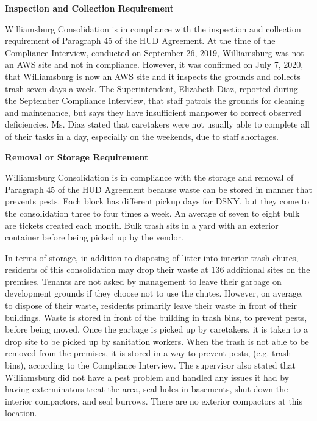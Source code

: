 

\textbf{Inspection and Collection Requirement}

Williamsburg Consolidation is in compliance with the inspection and collection requirement of Paragraph 45 of the HUD Agreement. At the time of the Compliance Interview, conducted on September 26, 2019, Williamsburg was not an AWS site and not in compliance. However, it was confirmed on July 7, 2020, that Williamsburg is now an AWS site and it inspects the grounds and collects trash seven days a week. The Superintendent, Elizabeth Diaz, reported during the September Compliance Interview, that staff patrols the grounds for cleaning and maintenance, but says they have insufficient manpower to correct observed deficiencies. Ms. Diaz stated that caretakers were not usually able to complete all of their tasks in a day, especially on the weekends, due to staff shortages.

\textbf{Removal or Storage Requirement}

Williamsburg Consolidation is in compliance with the storage and removal of Paragraph 45 of the HUD Agreement because waste can be stored in manner that prevents pests. Each block has different pickup days for DSNY, but they come to the consolidation three to four times a week. An average of seven to eight bulk are tickets created each month.  Bulk trash sits in a yard with an exterior container before being picked up by the vendor. 

In terms of storage, in addition to disposing of litter into interior trash chutes, residents of this consolidation may drop their waste at 136 additional sites on the premises. Tenants are not asked by management to leave their garbage on development grounds if they choose not to use the chutes. However, on average, to dispose of  their waste, residents primarily leave their waste in front of their buildings. Waste is stored in front of the building in trash bins, to prevent pests, before being moved. Once the garbage is picked up by caretakers, it is taken to a drop site to be picked up by sanitation workers. When the trash is not able to be removed from the premises, it is stored in a way to prevent pests, (e.g. trash bins), according to the Compliance Interview. The supervisor also stated that Williamsburg did not have a pest problem and handled any issues it had by having exterminators treat the area, seal holes in basements, shut down the interior compactors, and seal burrows. There are no exterior compactors at this location.

